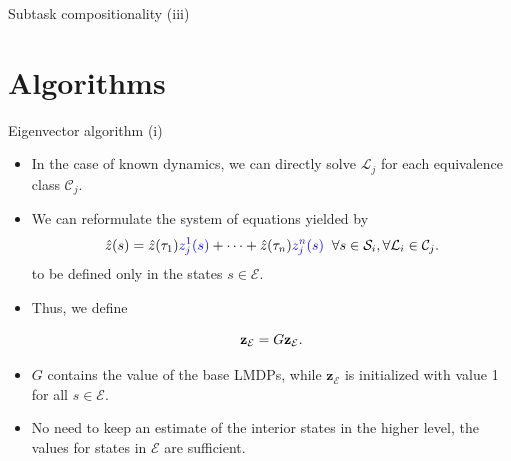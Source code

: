 \documentclass{beamer}
\theoremstyle{mystyle}
\newcommand{\cC}{\mathcal{C}}
\newcommand{\cE}{\mathcal{E}}
\newcommand{\cL}{\mathcal{L}}
\newcommand{\cS}{\mathcal{S}}
\begin{document}
\begin{frame}{Subtask compositionality (iii)}
\begin{figure}
\begin{center}
{
}
\end{center}
\end{figure}
    
\end{frame}

\section{Algorithms}

\begin{frame}{Eigenvector algorithm (i)}
\begin{itemize}
    \item In the case of known dynamics, we can directly solve $\cL_j$ for each equivalence class $\cC_j$.
    \item We can reformulate the system of equations yielded by
    \begin{equation*}
        \hat{z}(s)=\hat{z}(\tau_1) {\color{blue} z_j^1(s)}+\cdots+\hat{z}(\tau_n){\color{blue}z_j^n(s)} \;\; \forall s\in\cS_i,\forall\cL_i\in\cC_j.
    \end{equation*}
    to be defined only in the states $s \in \cE$.
    
    \item Thus, we define 
    
    \begin{equation*}\label{eq:exits}
     {\bf z}_\cE=G{\bf z}_\cE.
    \end{equation*}
    
    \item $G$ contains the value of the base LMDPs, while $\mathbf{z}_\cE$ is initialized with value 1 for all $s \in \cE$.
    \item No need to keep an estimate of the interior states in the higher level, the values for states in $\cE$ are sufficient.
\end{itemize}
    
\end{frame}
\end{document}
